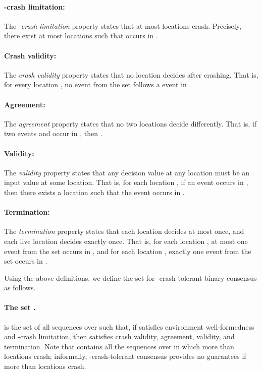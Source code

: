 \documentclass[11pt]{article}
\numberwithin{theorem}{section}
\begin{document}
\paragraph{-crash limitation:} The \emph{-crash limitation} property states that at most  locations crash. Precisely, there exist at most  locations  such that  occurs in . 

\paragraph{Crash validity:} The \emph{crash validity} property states that no location decides after crashing.  That is, for every location , no event from the set  follows a  event in .

\paragraph{Agreement:} The \emph{agreement} property states that no two locations decide differently. That is, if two events  and  occur in , then . 

\paragraph{Validity:} The \emph{validity} property states that any decision value at any location must be an input value at some location. That is, for each location , if an event  occurs in , then there exists a location  such that the event  occurs in . 


\paragraph{Termination:} The \emph{termination} property states that each location decides at most once, and each live location decides exactly once. That is, for each location , at most one event from the set  occurs in , and for each location , exactly one event from the set  occurs in . 


Using the above definitions, we define the set  for -crash-tolerant binary consensus as follows.

\paragraph{The set .}  is the set of all sequences  over  such that, if  satisfies  environment well-formedness and -crash limitation,
then  satisfies crash validity, agreement, validity, and termination. Note that  contains all the sequences over  in which more than  locations crash; informally, -crash-tolerant consensus provides no guarantees if more than  locations crash.
\end{document}
